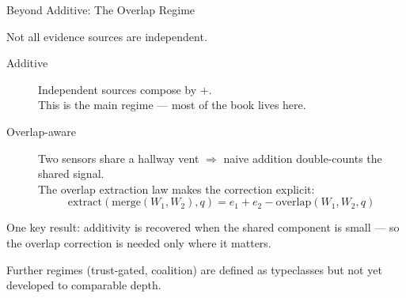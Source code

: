 \documentclass[aspectratio=169,11pt]{beamer}
\begin{document}
\begin{frame}{Beyond Additive: The Overlap Regime}

Not all evidence sources are independent.

\begin{description}
\item[Additive] Independent sources compose by $+$.\\
  This is the main regime --- most of the book lives here.
\item[Overlap-aware] Two sensors share a hallway vent $\Rightarrow$
  naive addition double-counts the shared signal.\\
  The overlap extraction law makes the correction explicit:
  \[
    \mathrm{extract}(\mathrm{merge}(W_1, W_2), q)
    = e_1 + e_2 - \mathrm{overlap}(W_1, W_2, q)
  \]
\end{description}

\medskip
One key result: \alert{additivity is recovered} when the shared
component is small --- so the overlap correction is needed only
where it matters.

\smallskip
{\small Further regimes (trust-gated, coalition) are defined as
typeclasses but not yet developed to comparable depth.}

\end{frame}
\end{document}
